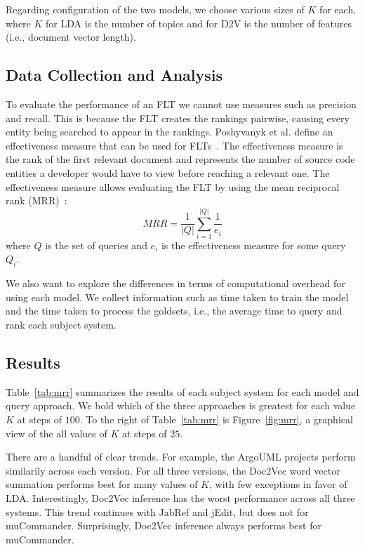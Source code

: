 Regarding configuration of the two models, we choose various sizes of $K$ for
each, where $K$ for LDA is the number of topics and for D2V is the number of
features (i.e., document vector length).


\subsection{Data Collection and Analysis}

To evaluate the performance of an FLT we cannot use measures such as precision
and recall. This is because the FLT creates the rankings pairwise, causing every
entity being searched to appear in the rankings.  Poshyvanyk et al. define an
effectiveness measure that can be used for FLTs~\cite{Poshyvanyk-etal_2007}.
The effectiveness measure is the rank of the first relevant document and
represents the number of source code entities a developer would have to view
before reaching a relevant one.  The effectiveness measure allows evaluating the
FLT by using the mean reciprocal rank (MRR)~\cite{Voorhees_1999}: %
\begin{equation}
    MRR = \frac{1}{|Q|} \sum_{i=1}^{|Q|} \frac{1}{e_i}
\end{equation}
where $Q$ is the set of queries and $e_i$ is the effectiveness measure for some
query $Q_i$.

We also want to explore the differences in terms of computational overhead for
using each model.  We collect information such as time taken to train the model
and the time taken to process the goldsets, i.e., the average time to query and
rank each subject system.

\subsection{Results}





Table~\ref{tab:mrr} summarizes the results of each subject system for each model
and query approach. We bold which of the three approaches is greatest for each
value $K$ at steps of $100$. To the right of Table~\ref{tab:mrr} is
Figure~\ref{fig:mrr}, a graphical view of the all values of $K$ at steps of
$25$.

There are a handful of clear trends. For example, the ArgoUML projects perform
similarily across each version. For all three versions, the Doc2Vec word vector
summation performs best for many values of $K$, with few exceptions in favor of
LDA.  Interestingly, Doc2Vec inference has the worst performance across all three
systems. This trend continues with JabRef and jEdit, but does not for
muCommander.  Surprisingly, Doc2Vec inference always performs best for muCommander.

